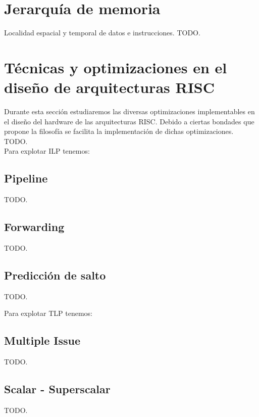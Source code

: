 \section{Jerarquía de memoria}
\label{sec:mem_hierarchy}

Localidad espacial y temporal de datos e instrucciones. TODO.

\section{Técnicas y optimizaciones en el diseño de arquitecturas RISC}
\label{sec:optimizations}

Durante esta sección estudiaremos las diversas optimizaciones implementables en 
el diseño del hardware de las arquitecturas RISC. Debido a ciertas bondades que 
propone la filosofía se facilita la implementación de dichas optimizaciones. 
TODO.\\

Para explotar ILP tenemos:
\subsection{Pipeline}
\label{subsec:optimizations-pipeline}

TODO.

\subsection{Forwarding}
\label{subsec:optimizations-forwarding}

TODO.

\subsection{Predicción de salto}
\label{subsec:optimizations-branch_prediction}

TODO.

Para explotar TLP tenemos:
\subsection{Multiple Issue}
\label{subsec:optimizations-multiple_issue}

TODO.

\subsection{Scalar - Superscalar}
\label{subsec:optimizations-scalar_superscalar}

TODO.

